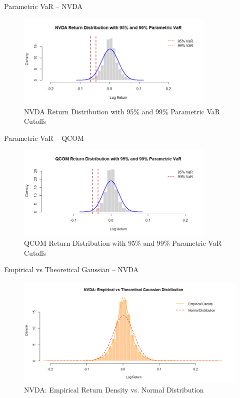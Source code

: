 \documentclass{beamer}[9pt]
\begin{document}
\begin{frame}{Parametric VaR – NVDA}
	\begin{figure}[!h]
		\centering
		\includegraphics[width=0.85\textwidth]{plots/nvda_parametric_var_hist.png}
		\caption{NVDA Return Distribution with 95\% and 99\% Parametric VaR Cutoffs}
	\end{figure}
\end{frame}

\begin{frame}{Parametric VaR – QCOM}
	\begin{figure}[!h]
		\centering
		\includegraphics[width=0.85\textwidth]{plots/qcom_parametric_var_hist.png}
		\caption{QCOM Return Distribution with 95\% and 99\% Parametric VaR Cutoffs}
	\end{figure}
\end{frame}

\begin{frame}{Empirical vs Theoretical Gaussian – NVDA}
	\begin{figure}[!h]
		\centering
		\includegraphics[width=0.85\linewidth]{plots/nvda_density_plot.png}
		\caption{NVDA: Empirical Return Density vs. Normal Distribution}
	\end{figure}
\end{frame}
\end{document}
